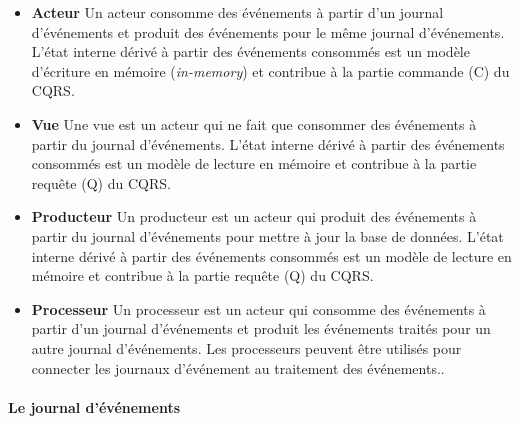 \begin{itemize}
	\item \textbf{Acteur} Un acteur consomme des événements à partir d'un journal 
	d'événements et produit des événements pour le même journal d'événements. 
	L'état interne dérivé à partir des événements consommés est un modèle 
	d'écriture 
	en mémoire (\textit{in-memory}) et contribue à la partie commande (C) du 
	CQRS.
	\item \textbf{Vue} Une vue est un acteur qui ne fait que consommer des 
	événements à 
	partir du journal d'événements. L'état interne dérivé à partir des événements 
	consommés est un modèle de lecture en mémoire et contribue à la partie 
	requête (Q) du CQRS.
	\item \textbf{Producteur} Un producteur est un acteur qui produit des 
	événements à 
	partir 
	du journal d'événements pour mettre à jour la base de données. L'état interne 
	dérivé 
	à partir des événements consommés est un modèle de lecture en mémoire et 
	contribue à la partie requête (Q) du CQRS.
	\item \textbf{Processeur} Un processeur est un acteur qui consomme des 
	événements 
	à 
	partir d'un journal d'événements et produit les événements traités pour un autre 
	journal d'événements. Les processeurs peuvent être utilisés pour connecter les 
	journaux d'événement au traitement des événements..
\end{itemize}


\paragraph{Le journal d'événements}

